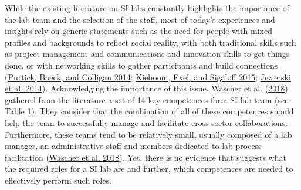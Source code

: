 \documentclass[AMA,STIX1COL,APA,STIX2COL]{WileyNJD-v2}
\begin{document}
While the existing literature on SI labs constantly highlights the
importance of the lab team and the selection of the staff, most of
today's experiences and insights rely on generic statements such as the
need for people with mixed profiles and backgrounds to reflect social
reality, with both traditional skills such as project management and
communications and innovation skills to get things done, or with
networking skills to gather participants and build connections
(\protect\hyperlink{ref-Puttick2014-Teams}{Puttick, Baeck, and Colligan
2014}; \protect\hyperlink{ref-Kieboom2015}{Kieboom, Exel, and Sigaloff
2015}; \protect\hyperlink{ref-Jezierski2014}{Jezierski et al. 2014}).
Acknowledging the importance of this issue, Wascher et al.
(\protect\hyperlink{ref-Wascher2018}{2018}) gathered from the literature
a set of 14 key competences for a SI lab team (see Table 1). They
consider that the combination of all of these competences should help
the team to successfully manage and facilitate cross-sector
collaborations. Furthermore, these teams tend to be relatively small,
usually composed of a lab manager, an administrative staff and members
dedicated to lab process facilitation
(\protect\hyperlink{ref-Wascher2018}{Wascher et al. 2018}). Yet, there
is no evidence that suggests what the required roles for a SI lab are
and further, which competences are needed to effectively perform such
roles.

\providecommand{\docline}[3]{\noalign{\global\setlength{\arrayrulewidth}{#1}}\arrayrulecolor[HTML]{#2}\cline{#3}}

\setlength{\tabcolsep}{2pt}

\renewcommand*{\arraystretch}{1.5}
\end{document}
